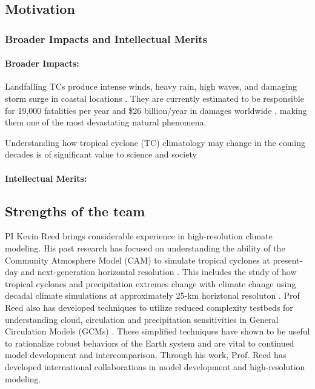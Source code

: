 \documentclass[11pt]{article}
\begin{document}
\subsection{Motivation} \label{sec:Motivation}

\subsubsection{Broader Impacts and Intellectual Merits}

\paragraph{Broader Impacts:}  

Landfalling TCs produce intense winds, heavy rain, high waves, and damaging storm surge in coastal locations \citep{EmanuelDivineWind}. They are currently estimated to be responsible for 19,000 fatalities per year and \$26 billion/year in damages worldwide \citep{Mendelsohn2012}, making them one of the most devastating natural phenomena.

Understanding how tropical cyclone (TC) climatology may change in the coming decades is of significant value to science and society

\paragraph{Intellectual Merits:}  

\subsection{Strengths of the team}

PI Kevin Reed brings considerable experience in high-resolution climate modeling.  His past research has focused on understanding the ability of the Community Atmosphere Model (CAM) to simulate tropical cyclones at present-day and next-generation horizontal resolution \citep{Reed2011a,Reed2011c}.  This includes the study of how tropical cyclones and precipitation extremes change with climate change using decadal climate simulations at approximately 25-km horiztonal resoluton \citep{Wehner2014,Wehner2015}. Prof Reed also has developed techniques to utilize reduced complexity testbeds for understanding cloud, circulation and precipitation sensitivities in General Circulation Models (GCMs) \citep{Reed2012a,Reed2014}. These simplified techniques have shown to be useful to rationalize robust behaviors of the Earth system and are vital to continued model development and intercomparison. Through his work, Prof. Reed has developed international collaborations in model development and high-resolution modeling.
\end{document}

